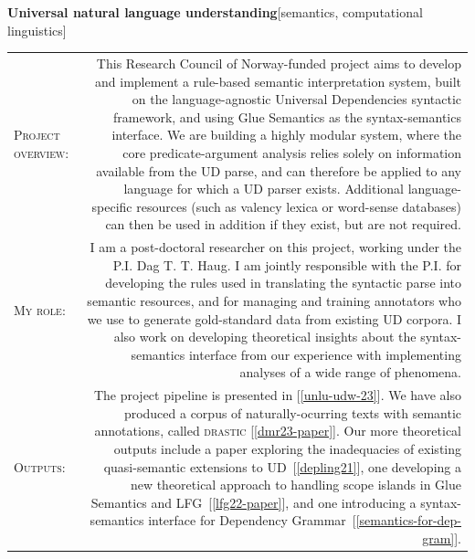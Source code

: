 \documentclass[11pt,a4paper]{article}
\makeatletter
\newlength{\rulelength}%
\newcommand{\REx}[2]{%
\vspace*{0.1\baselineskip}%
{\large\textbf{#1}\hfill\textnormal{[#2]}}%
\vspace*{0.5\baselineskip}%
}
\newenvironment{cvsection}{%
  \setlength{\extrarowheight}{0.70ex}
  \begin{longtable}[l]{@{} L R @{}}
}{%
  \end{longtable}
}
\newcommand{\sref}[1]{[\ref{#1}]}
\newcommand{\researchsubhead}[1]{%
\textsc{#1}:%
}
\makeatother
\begin{document}
\REx{Universal natural language understanding}{semantics, computational
  linguistics}
\begin{cvsection}
  \researchsubhead{Project overview} &%
  This Research Council of Norway-funded project aims to develop and implement a
  rule-based semantic interpretation system, built on the language-agnostic
  Universal Dependencies syntactic framework, and using Glue Semantics as the
  syntax-semantics interface. We are building a highly modular system, where the
  core predicate-argument analysis relies solely on information available from
  the UD parse, and can therefore be applied to any language for which a UD
  parser exists. Additional language-specific resources (such as valency lexica
  or word-sense databases) can then be used in addition if they exist, but are
  not required.
  \\
  \researchsubhead{My role} &%
  I am a post-doctoral researcher on this project, working under the P.I. Dag T.
  T. Haug. I am jointly responsible with the P.I. for developing the rules used
  in translating the syntactic parse into semantic resources, and for managing
  and training annotators who we use to generate gold-standard data from
  existing UD corpora. I also work on developing theoretical insights about the
  syntax-semantics interface from our experience with implementing analyses of a
  wide range of phenomena.
  \\
  \researchsubhead{Outputs} &%
  The project pipeline is presented in \sref{unlu-udw-23}. We have also produced
  a corpus of naturally-ocurring texts with semantic annotations, called
  \textsc{drastic} \sref{dmr23-paper}. Our more theoretical outputs include a
  paper exploring the inadequacies of existing quasi-semantic extensions to
  UD~\sref{depling21}, one developing a new theoretical approach to handling
  scope islands in Glue Semantics and LFG~\sref{lfg22-paper}, and one
  introducing a syntax-semantics interface for Dependency
  Grammar~\sref{semantics-for-dep-gram}.
\end{cvsection}
\end{document}
